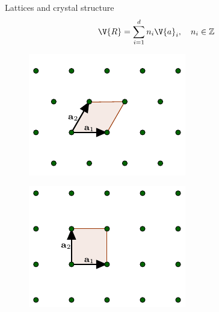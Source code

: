 \documentclass{beamer}
\begin{document}
\begin{frame}{Lattices and crystal structure}
\begin{equation*}
\V{R} = \sum_{i = 1}^{d} n_i \V{a}_i, \quad n_i \in \mathbb{Z}
\end{equation*}
\begin{figure}[H]
	\centering
	\begin{minipage}{.4\textwidth}
		\centering
		\includegraphics[width=\linewidth]{figures/triangularUnit.pdf}
		\label{fig:triangular_unitcell}
	\end{minipage}%
	\hfill
	\begin{minipage}{.4\textwidth}
		\centering
		\includegraphics[width=\linewidth]{figures/squareUnit.pdf}
		\label{fig:square_unitcell}
	\end{minipage}
\end{figure}
\end{frame}
\end{document}
